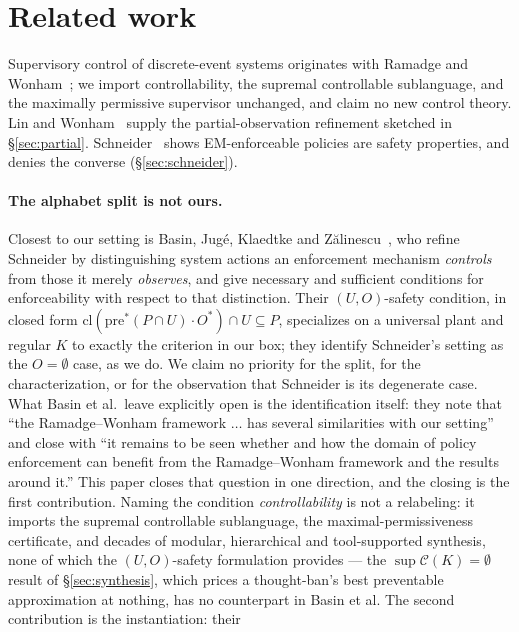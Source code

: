 \documentclass[11pt,a4paper]{article}  \usepackage{mdframed} \usepackage{graphicx}
\begin{document}


\section{Related work}\label{sec:related} Supervisory control of discrete-event systems originates with Ramadge and
Wonham~\cite{rw87,rw89}; we import controllability, the supremal controllable sublanguage, and the maximally permissive
supervisor unchanged, and claim no new control theory. Lin and Wonham~\cite{lw88} supply the partial-observation refinement
sketched in \S\ref{sec:partial}. Schneider~\cite{schneider} shows EM-enforceable policies are safety properties, and denies
the converse (\S\ref{sec:schneider}).

\paragraph{The alphabet split is not ours.} Closest to our setting is Basin, Jug\'e, Klaedtke and
Z\u{a}linescu~\cite{bjkz13}, who refine Schneider by distinguishing system actions an enforcement mechanism \emph{controls}
from those it merely \emph{observes}, and give necessary and sufficient conditions for enforceability with respect to that
distinction. Their $(U,O)$-safety condition, in closed form $\mathrm{cl}(\mathrm{pre}^*(P\cap U)\cdot O^*)\cap U\subseteq P$,
specializes on a universal plant and regular $K$ to exactly the criterion in our box; they identify Schneider's setting as
the $O=\emptyset$ case, as we do. We claim no priority for the split, for the characterization, or for the observation that
Schneider is its degenerate case. What Basin et al.\ leave explicitly open is the identification itself: they note that ``the
Ramadge--Wonham framework $\ldots$ has several similarities with our setting'' and close with ``it remains to be seen whether
and how the domain of policy enforcement can benefit from the Ramadge--Wonham framework and the results around it.'' This
paper closes that question in one direction, and the closing is the first contribution. Naming the condition
\emph{controllability} is not a relabeling: it imports the supremal controllable sublanguage, the maximal-permissiveness
certificate, and decades of modular, hierarchical and tool-supported synthesis, none of which the $(U,O)$-safety formulation
provides --- the $\sup\mathcal{C}(K)=\emptyset$ result of \S\ref{sec:synthesis}, which prices a thought-ban's best
preventable approximation at nothing, has no counterpart in Basin et al. The second contribution is the instantiation: their
\end{document}
